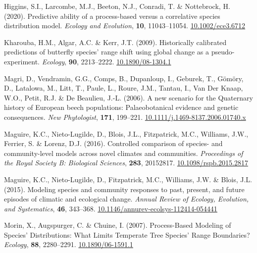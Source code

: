 \documentclass[11pt,]{article}
\newlength{\cslhangindent}
\newenvironment{CSLReferences}[2] %
 {%
  \setlength{\parindent}{0pt}
  \ifodd #1 \everypar{\setlength{\hangindent}{\cslhangindent}}\ignorespaces\fi
  \ifnum #2 > 0
  \setlength{\parskip}{#2\baselineskip}
  \fi
 }%
 {}
\begin{document}
\begin{CSLReferences}{1}{0}
\leavevmode{}%
Higgins, S.I., Larcombe, M.J., Beeton, N.J., Conradi, T. \& Nottebrock,
H. (2020). Predictive ability of a process-based versus a correlative
species distribution model. \emph{Ecology and Evolution}, \textbf{10},
11043--11054.
\href{https://doi.org/10.1002/ece3.6712}{10.1002/ece3.6712}

\leavevmode{}%
Kharouba, H.M., Algar, A.C. \& Kerr, J.T. (2009). Historically
calibrated predictions of butterfly species' range shift using global
change as a pseudo-experiment. \emph{Ecology}, \textbf{90}, 2213--2222.
\href{https://doi.org/10.1890/08-1304.1}{10.1890/08-1304.1}

\leavevmode{}%
Magri, D., Vendramin, G.G., Comps, B., Dupanloup, I., Geburek, T.,
Gömöry, D., Latalowa, M., Litt, T., Paule, L., Roure, J.M., Tantau, I.,
Van Der Knaap, W.O., Petit, R.J. \& De Beaulieu, J.-L. (2006). A new
scenario for the {Quaternary} history of {European} beech populations:
Palaeobotanical evidence and genetic consequences. \emph{New
Phytologist}, \textbf{171}, 199--221.
\href{https://doi.org/10.1111/j.1469-8137.2006.01740.x}{10.1111/j.1469-8137.2006.01740.x}

\leavevmode{}%
Maguire, K.C., Nieto-Lugilde, D., Blois, J.L., Fitzpatrick, M.C.,
Williams, J.W., Ferrier, S. \& Lorenz, D.J. (2016). Controlled
comparison of species- and community-level models across novel climates
and communities. \emph{Proceedings of the Royal Society B: Biological
Sciences}, \textbf{283}, 20152817.
\href{https://doi.org/10.1098/rspb.2015.2817}{10.1098/rspb.2015.2817}

\leavevmode{}%
Maguire, K.C., Nieto-Lugilde, D., Fitzpatrick, M.C., Williams, J.W. \&
Blois, J.L. (2015). Modeling species and community responses to past,
present, and future episodes of climatic and ecological change.
\emph{Annual Review of Ecology, Evolution, and Systematics},
\textbf{46}, 343--368.
\href{https://doi.org/10.1146/annurev-ecolsys-112414-054441}{10.1146/annurev-ecolsys-112414-054441}

\leavevmode{}%
Morin, X., Augspurger, C. \& Chuine, I. (2007). Process-{Based}
{Modeling} of {Species}' {Distributions}: {What} {Limits} {Temperate}
{Tree} {Species}' {Range} {Boundaries}? \emph{Ecology}, \textbf{88},
2280--2291. \href{https://doi.org/10.1890/06-1591.1}{10.1890/06-1591.1}


\end{CSLReferences}
\end{document}
